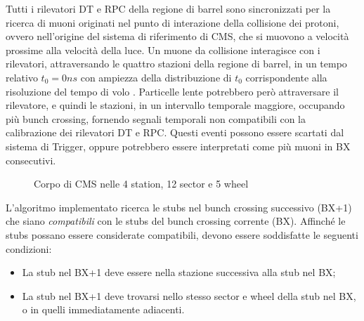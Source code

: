 Tutti i rilevatori DT e RPC della regione di barrel sono sincronizzati per la ricerca di muoni originati nel punto di interazione della collisione dei protoni, ovvero nell'origine del sistema di riferimento di CMS, che si muovono a velocità prossime alla velocità della luce. Un muone da collisione interagisce con i rilevatori, attraversando le quattro stazioni della regione di barrel, in un tempo relativo $t_0 = 0 \si{ns}$ con ampiezza della distribuzione di $t_0$ corrispondente alla risoluzione del tempo di volo \cite{MasterThesisGioMoc}. Particelle lente potrebbero però attraversare il rilevatore, e quindi le stazioni, in un intervallo temporale maggiore, occupando più bunch crossing, fornendo segnali temporali non compatibili con la calibrazione dei rilevatori DT e RPC. Questi eventi possono essere scartati dal sistema di Trigger, oppure potrebbero essere interpretati come più muoni in BX consecutivi.


\begin{figure}[t]
  \centering
  \centering
  \caption{Corpo di CMS nelle 4 station, 12 sector e 5 wheel}
  \label{fig:CMSLayout}
\end{figure}


L'algoritmo implementato ricerca le stubs nel bunch crossing successivo (BX+1) che siano \textit{compatibili} con le stubs del bunch crossing corrente (BX). Affinché le stubs possano essere considerate compatibili, devono essere soddisfatte le seguenti condizioni:

\begin{itemize}
  \item La stub nel BX+1 deve essere nella stazione successiva alla stub nel BX;
  \item La stub nel BX+1 deve trovarsi nello stesso sector e wheel della stub nel BX, o in quelli immediatamente adiacenti.
\end{itemize}

